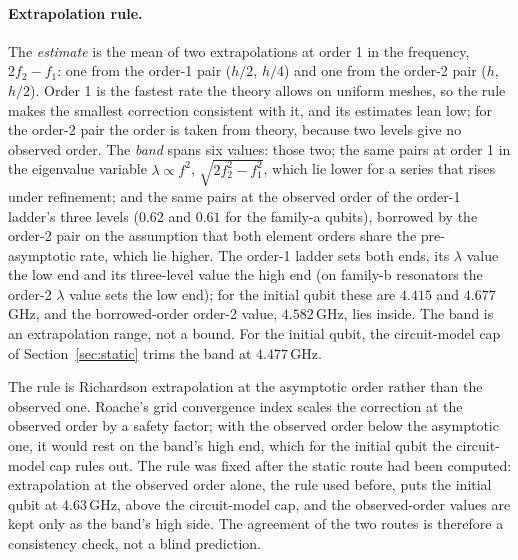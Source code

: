 \documentclass{anvil-paper}
\begin{document}
\paragraph{Extrapolation rule.}
The \emph{estimate} is the mean of two extrapolations at order 1 in the
frequency, $2f_2 - f_1$: one from the order-1 pair ($h/2$, $h/4$) and one
from the order-2 pair ($h$, $h/2$). Order 1 is the fastest rate the
theory allows on uniform meshes, so the rule makes the smallest correction consistent with
it, and its estimates lean low; for the order-2 pair the order is taken
from theory, because two levels give no observed order. The \emph{band}
spans six values: those two; the same pairs at order 1 in the eigenvalue
variable $\lambda\propto f^2$, $\sqrt{2f_2^2 - f_1^2}$, which lie lower for
a series that rises under refinement; and the same pairs at the observed
order of the order-1 ladder's three levels ($0.62$ and $0.61$ for the family-a
qubits), borrowed by the order-2 pair on the assumption that both element
orders share the pre-asymptotic rate, which lie higher. The order-1 ladder
sets both ends, its $\lambda$ value the low end and its three-level value
the high end (on family-b resonators the order-2 $\lambda$ value sets the
low end); for the initial qubit these are $4.415$ and $4.677$\,GHz, and the
borrowed-order order-2 value, $4.582$\,GHz, lies inside. The band is an
extrapolation range, not a bound. For the initial qubit, the circuit-model
cap of Section~\ref{sec:static} trims the band at $4.477$\,GHz.

The rule is Richardson extrapolation \citep{richardson1911approximate} at
the asymptotic order rather than the observed one. Roache's grid
convergence index \citep{roache1994perspective} scales the correction at
the observed order by a safety factor; with the observed order below the
asymptotic one, it would rest on the band's high end, which for the
initial qubit the circuit-model cap rules out. The rule was fixed after the static route had been
computed: extrapolation at the observed order alone, the rule used before,
puts the initial qubit at $4.63$\,GHz, above the circuit-model cap, and the
observed-order values are kept only as the band's high side. The agreement
of the two routes is therefore a consistency check, not a blind
prediction.
\end{document}
